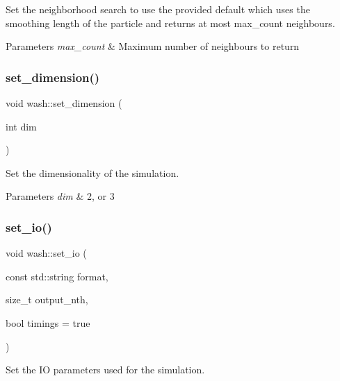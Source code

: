 Set the neighborhood search to use the provided default which uses the smoothing length of the particle and returns at most max\+\_\+count neighbours. 


\begin{DoxyParams}{Parameters}
{\em max\+\_\+count} & Maximum number of neighbours to return \\
\hline
\end{DoxyParams}
\mbox{\label{namespacewash_a6b9608d3d8934431c9ab6af488992f10}} 
\subsubsection{\texorpdfstring{set\+\_\+dimension()}{set\_dimension()}}
{\footnotesize\ttfamily void wash\+::set\+\_\+dimension (\begin{DoxyParamCaption}\item[{int}]{dim }\end{DoxyParamCaption})}



Set the dimensionality of the simulation. 


\begin{DoxyParams}{Parameters}
{\em dim} & 2, or 3 \\
\hline
\end{DoxyParams}
\mbox{\label{namespacewash_aaa75af8f4a35ef4b222eace2714ee9f8}} 
\subsubsection{\texorpdfstring{set\+\_\+io()}{set\_io()}}
{\footnotesize\ttfamily void wash\+::set\+\_\+io (\begin{DoxyParamCaption}\item[{const std\+::string}]{format,  }\item[{size\+\_\+t}]{output\+\_\+nth,  }\item[{bool}]{timings = {\ttfamily true} }\end{DoxyParamCaption})}



Set the IO parameters used for the simulation. 

\mbox{\label{namespacewash_aeb7b287406244c8ab192d0524ad4da5b}} 
